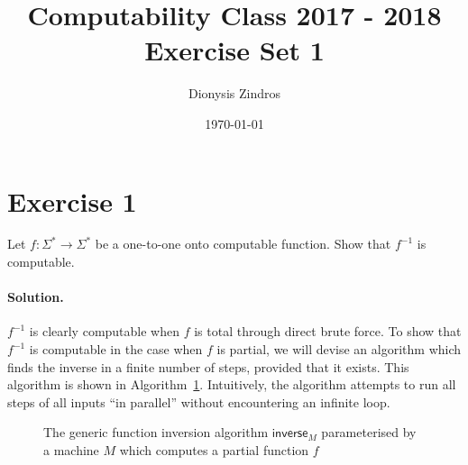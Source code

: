 \documentclass[11pt]{llncs}
\begin{document}
\title{
Computability Class 2017 - 2018\\
Exercise Set 1}
\date{\today}
\author{Dionysis Zindros\\
    }
\maketitle
\noindent
\makebox[\linewidth]{\small \today}

\thispagestyle{plain}

\section*{Exercise 1}
Let $f: \Sigma^* \rightarrow \Sigma^*$ be a one-to-one onto computable function.
Show that $f^{-1}$ is computable.

\paragraph{Solution.}

$f^{-1}$ is clearly computable when $f$ is total through direct brute force.
To show that $f^{-1}$ is computable in the case when $f$ is partial, we
will devise an algorithm which finds the inverse in a finite number of
steps, provided that it exists. This algorithm is shown in
Algorithm~\ref{alg.1}. Intuitively, the algorithm attempts to run all steps of
all inputs ``in parallel'' without encountering an infinite loop.

\begin{figure}[t]
\begin{algorithm}[H]
  \caption{\label{alg.1}
      The generic function inversion algorithm
      $\textsf{inverse}_M$
      parameterised by a machine $M$ which computes
      a partial function $f$}
  \begin{algorithmic}[1]
                    \State{}
                \EndIf
            \EndFor
        \EndWhile
      \EndFunction
  \end{algorithmic}
\end{algorithm}
\end{figure}
\end{document}
